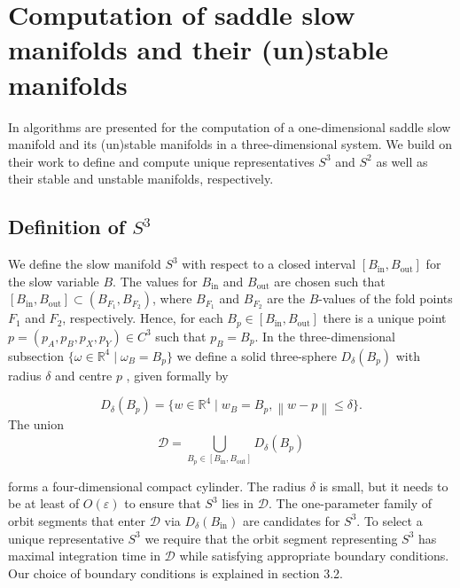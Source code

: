 \documentclass{ws-ijbc}
\begin{document}
 \section{Computation of saddle slow manifolds and their (un)stable manifolds}

In \cite{Saeed_Paper} algorithms are presented for the computation of a one-dimensional saddle slow manifold and its (un)stable manifolds in a three-dimensional system.  We build on their work to define and compute unique representatives $S^3$ and $S^2$ as well as their stable and unstable manifolds, respectively.

\subsection{Definition of $S^3$}    
We define the slow manifold $S^3$ with respect to a closed interval $[B_{\mathrm{in}},B_{\mathrm{out}}]$ for the slow variable $B$.  The values for $B_{\mathrm{in}}$ and $B_{\mathrm{out}}$ are chosen such that $[B_{\mathrm{in}},B_{\mathrm{out}}] \subset (B_{F_1}, B_{F_2})$, where $B_{F_1}$ and $B_{F_2}$ are the $B$-values of the fold points $F_1$ and $F_2$, respectively.  Hence, for each $B_p \in [B_{\mathrm{in}},B_{\mathrm{out}}]$ there is a unique point $p=(p_A,p_B,p_X,p_Y) \in C^3$ such that $p_B = B_p$.  In the three-dimensional subsection $\{ \omega \in \mathbb{R}^4 \; | \; \omega_B=B_p\}$ we define a solid three-sphere $D_\delta(B_p)$ with radius $\delta$ and centre $p$ , given formally by

\begin{equation*}
D_\delta(B_p)=\{w \in \mathbb{R}^4 \; | \; w_B = B_p, \left\lVert w-p \right\rVert \leq \delta\}.
\end{equation*}    
\noindent
The union 
\begin{equation*}
\mathscr{D} = \bigcup\limits_{B_p \in [B_{\mathrm{in}}, B_{\mathrm{out}}]}^{} D_\delta(B_p)
\end{equation*}


\noindent
forms a four-dimensional compact cylinder.  The radius $\delta$ is small, but it needs to be at least of $O(\varepsilon)$ to ensure that $S^3$ lies in $\mathscr{D}$.  The one-parameter family of orbit segments that enter $\mathscr{D}$ via $D_\delta(B_{\mathrm{in}})$ are candidates for $S^3$.   To select a unique representative $S^3$ we require that the orbit segment representing $S^3$ has maximal integration time in $\mathscr{D}$ while satisfying appropriate boundary conditions.  Our choice of boundary conditions is explained in section 3.2.
    
\end{document}

